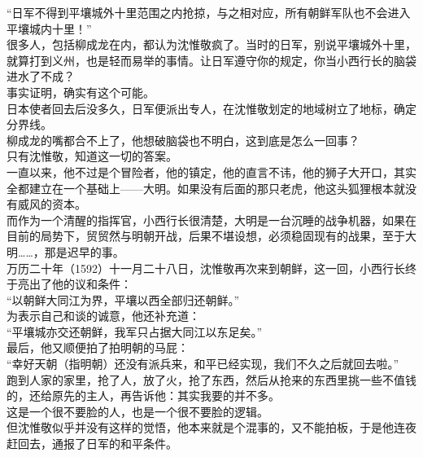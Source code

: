 \begin{multicols}{\theparacolNo}
“日军不得到平壤城外十里范围之内抢掠，与之相对应，所有朝鲜军队也不会进入平壤城内十里！”\\

很多人，包括柳成龙在内，都认为沈惟敬疯了。当时的日军，别说平壤城外十里，就算打到义州，也是轻而易举的事情。让日军遵守你的规定，你当小西行长的脑袋进水了不成？\\

事实证明，确实有这个可能。\\

日本使者回去后没多久，日军便派出专人，在沈惟敬划定的地域树立了地标，确定分界线。\\

柳成龙的嘴都合不上了，他想破脑袋也不明白，这到底是怎么一回事？\\

只有沈惟敬，知道这一切的答案。\\

一直以来，他不过是个冒险者，他的镇定，他的直言不讳，他的狮子大开口，其实全都建立在一个基础上——大明。如果没有后面的那只老虎，他这头狐狸根本就没有威风的资本。\\

而作为一个清醒的指挥官，小西行长很清楚，大明是一台沉睡的战争机器，如果在目前的局势下，贸贸然与明朝开战，后果不堪设想，必须稳固现有的战果，至于大明……，那是迟早的事。\\

万历二十年（1592）十一月二十八日，沈惟敬再次来到朝鲜，这一回，小西行长终于亮出了他的议和条件：\\

“以朝鲜大同江为界，平壤以西全部归还朝鲜。”\\

为表示自己和谈的诚意，他还补充道：\\

“平壤城亦交还朝鲜，我军只占据大同江以东足矣。”\\

最后，他又顺便拍了拍明朝的马屁：\\

“幸好天朝（指明朝）还没有派兵来，和平已经实现，我们不久之后就回去啦。”\\

跑到人家的家里，抢了人，放了火，抢了东西，然后从抢来的东西里挑一些不值钱的，还给原先的主人，再告诉他：其实我要的并不多。\\

这是一个很不要脸的人，也是一个很不要脸的逻辑。\\

但沈惟敬似乎并没有这样的觉悟，他本来就是个混事的，又不能拍板，于是他连夜赶回去，通报了日军的和平条件。\\


\end{multicols}
